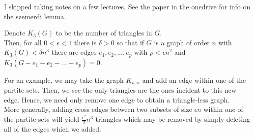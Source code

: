 \begin{note}{}
I skipped taking notes on a few lectures. See the paper in the onedrive for info on the szemerdi lemma.
\end{note}
\begin{lemma}
	Denote \(K_{3} \left( G \right) \) 	to be the number of triangles in \(G\).\\
	Then, for all \(0 < \epsilon < 1\) there is \(\delta > 0\) so that if \(G\) is a graph of order \(n\) with \(K_{3} \left( G \right) < \delta n^3\) there are edges \(e_1, e_2, \ldots ,e_{p}\) with \(p < \epsilon n^2\) and \(K_{3} \left( G - e_1 -e_2 - \ldots -e_{p} \right) = 0\).
\end{lemma}
For an example, we may take the graph \(K_{n, n} \) and add an edge within one of the partite sets. Then, we see the only triangles are the ones incident to this new edge. Hence, we need only remove one edge to obtain a triangle-less graph.\\
More generally, adding cross edges between two subsets of size \(\epsilon n\) within one of the partite sets will yield \(\frac{\epsilon^2}{2}n^3\) triangles which may be removed by simply deleting all of the edges which we added.

